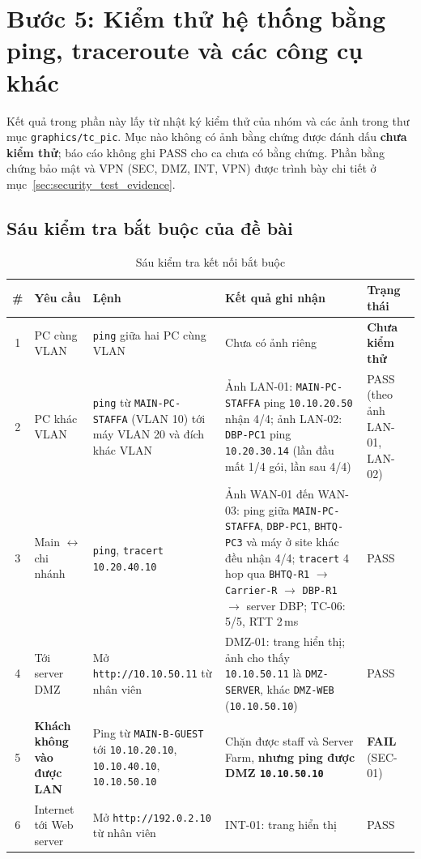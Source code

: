 \section{Bước 5: Kiểm thử hệ thống bằng ping, traceroute và các công cụ khác}
\label{sec:step5}

Kết quả trong phần này lấy từ nhật ký kiểm thử của nhóm và các ảnh trong thư mục \texttt{graphics/tc\_pic}. Mục nào không có ảnh bằng chứng được đánh dấu \textbf{chưa kiểm thử}; báo cáo không ghi PASS cho ca chưa có bằng chứng. Phần bằng chứng bảo mật và VPN (SEC, DMZ, INT, VPN) được trình bày chi tiết ở mục~\ref{sec:security_test_evidence}.

\subsection{Sáu kiểm tra bắt buộc của đề bài}
\begin{small}
\setlength{\tabcolsep}{3pt}
\begin{longtable}{|c|p{2.3cm}|p{3.0cm}|p{4.6cm}|p{2.6cm}|}
\caption{Sáu kiểm tra kết nối bắt buộc} \label{tab:six_checks} \\
\hline
\textbf{\#} & \textbf{Yêu cầu} & \textbf{Lệnh} & \textbf{Kết quả ghi nhận} & \textbf{Trạng thái} \\ \hline
\endhead
1 & PC cùng VLAN & \texttt{ping} giữa hai PC cùng VLAN & Chưa có ảnh riêng & \textbf{Chưa kiểm thử} \\ \hline
2 & PC khác VLAN & \texttt{ping} từ \texttt{MAIN-PC-STAFFA} (VLAN 10) tới máy VLAN 20 và đích khác VLAN & Ảnh LAN-01: \texttt{MAIN-PC-STAFFA} ping \texttt{10.10.20.50} nhận 4/4; ảnh LAN-02: \texttt{DBP-PC1} ping \texttt{10.20.30.14} (lần đầu mất 1/4 gói, lần sau 4/4) & PASS (theo ảnh LAN-01, LAN-02) \\ \hline
3 & Main $\leftrightarrow$ chi nhánh & \texttt{ping}, \texttt{tracert 10.20.40.10} & Ảnh WAN-01 đến WAN-03: ping giữa \texttt{MAIN-PC-STAFFA}, \texttt{DBP-PC1}, \texttt{BHTQ-PC3} và máy ở site khác đều nhận 4/4; \texttt{tracert} 4 hop qua \texttt{BHTQ-R1} $\to$ \texttt{Carrier-R} $\to$ \texttt{DBP-R1} $\to$ server DBP; TC-06: 5/5, RTT 2\,ms & PASS \\ \hline
4 & Tới server DMZ & Mở \texttt{http://10.10.50.11} từ nhân viên & DMZ-01: trang hiển thị; ảnh cho thấy \texttt{10.10.50.11} là \texttt{DMZ-SERVER}, khác \texttt{DMZ-WEB} (\texttt{10.10.50.10}) & PASS \\ \hline
5 & \textbf{Khách không vào được LAN} & Ping từ \texttt{MAIN-B-GUEST} tới \texttt{10.10.20.10}, \texttt{10.10.40.10}, \texttt{10.10.50.10} & Chặn được staff và Server Farm, \textbf{nhưng ping được DMZ \texttt{10.10.50.10}} & \textbf{FAIL} (SEC-01) \\ \hline
6 & Internet tới Web server & Mở \texttt{http://192.0.2.10} từ nhân viên & INT-01: trang hiển thị & PASS \\ \hline
\end{longtable}
\end{small}

